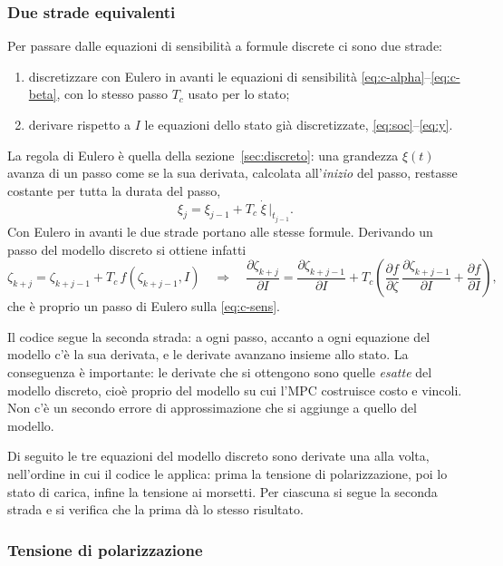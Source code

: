 \documentclass[11pt,a4paper]{article}
\newcommand{\Tc}{T_c}
\begin{document}
\subsubsection{Due strade equivalenti}

Per passare dalle equazioni di sensibilità a formule discrete ci sono due
strade:
\begin{enumerate}
  \item discretizzare con Eulero in avanti le equazioni di sensibilità
        \eqref{eq:c-alpha}--\eqref{eq:c-beta}, con lo stesso passo $\Tc$ usato
        per lo stato;
  \item derivare rispetto a $I$ le equazioni dello stato già discretizzate,
        \eqref{eq:soc}--\eqref{eq:y}.
\end{enumerate}
La regola di Eulero è quella della sezione~\ref{sec:discreto}: una grandezza
$\xi(t)$ avanza di un passo come se la sua derivata, calcolata all'\emph{inizio}
del passo, restasse costante per tutta la durata del passo,
\[
  \xi_j = \xi_{j-1} + \Tc\; \dot \xi\,\big|_{t_{j-1}} .
\]
Con Eulero in avanti le due strade portano alle stesse formule. Derivando un
passo del modello discreto si ottiene infatti
\[
  \zeta_{k+j} = \zeta_{k+j-1} + \Tc\, f(\zeta_{k+j-1}, I)
  \quad\Longrightarrow\quad
  \frac{\partial \zeta_{k+j}}{\partial I}
    = \frac{\partial \zeta_{k+j-1}}{\partial I}
      + \Tc\left(\frac{\partial f}{\partial \zeta}\,
                 \frac{\partial \zeta_{k+j-1}}{\partial I}
                 + \frac{\partial f}{\partial I}\right),
\]
che è proprio un passo di Eulero sulla \eqref{eq:c-sens}.

Il codice segue la seconda strada: a ogni passo, accanto a ogni equazione del
modello c'è la sua derivata, e le derivate avanzano insieme allo stato. La
conseguenza è importante: le derivate che si ottengono sono quelle
\emph{esatte} del modello discreto, cioè proprio del modello su cui l'MPC
costruisce costo e vincoli. Non c'è un secondo errore di approssimazione che
si aggiunge a quello del modello.

Di seguito le tre equazioni del modello discreto sono derivate una alla volta,
nell'ordine in cui il codice le applica: prima la tensione di polarizzazione,
poi lo stato di carica, infine la tensione ai morsetti. Per ciascuna si segue
la seconda strada e si verifica che la prima dà lo stesso risultato.

\subsubsection{Tensione di polarizzazione}
\end{document}
